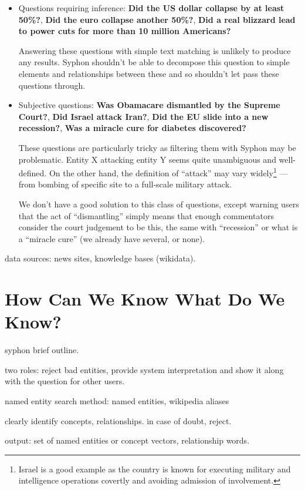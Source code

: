 \documentclass[11pt,a4paper]{article}
\begin{document}
\begin{itemize}
	\item Questions requiring inference: \textbf{Did the US dollar collapse by at least 50\%?},
		\textbf{Did the euro collapse another 50\%?},
		\textbf{Did a real blizzard lead to power cuts for more than 10 million Americans?}

		Answering these questions with simple text matching
		is unlikely to produce any results.  Syphon shouldn't
		be able to decompose this question to simple elements
		and relationships between these and so shouldn't let
		pass these questions through.

	\item Subjective questions: \textbf{Was Obamacare dismantled by the Supreme Court?},
		\textbf{Did Israel attack Iran?},
		\textbf{Did the EU slide into a new recession?},
		\textbf{Was a miracle cure for diabetes discovered?}

		These questions are particularly tricky as filtering
		them with Syphon may be problematic.  Entity X attacking
		entity Y seems quite unambiguous and well-defined.
		On the other hand, the definition of ``attack'' may
		vary widely\footnote{Israel is a good example as the country is known for executing military and intelligence operations covertly and avoiding admission of involvement.} --- from bombing of specific site
		to a full-scale military attack.

		We don't have a good solution to this class of questions,
		except warning users that the act of ``dismantling''
		simply means that enough commentators consider the court
		judgement to be this, the same with ``recession'' or what
		is a ``miracle cure'' (we already have several, or none).
\end{itemize}

data sources: news sites, knowledge bases (wikidata).

\section{How Can We Know What Do We Know?}
\label{syphon}

syphon brief outline.

two roles: reject bad entities, provide system interpretation and show
it along with the question for other users.

named entity search method: named entities, wikipedia aliases

clearly identify concepts, relationships.  in case of doubt, reject.

output: set of named entities or concept vectors, relationship words.
\end{document}
